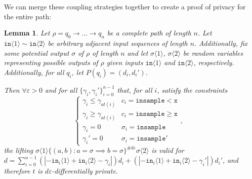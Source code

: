 \documentclass[12pt]{article}
\newcommand{\gguard}[1][x]{\texttt{insample}\geq #1}
\newcommand{\lguard}[1][x]{\texttt{insample} < #1}
\newcommand{\brangle}[1]{\langle #1 \rangle}
\newtheorem{lemma}[thm]{Lemma}
\theoremstyle{definition}
\begin{document}
We can merge these coupling strategies together to create a proof of privacy for the entire path: 

\begin{lemma}\label{multTransitionsCouplingProof}
    Let $\rho = q_0\to \ldots \to q_n$ be a complete path of length $n$. Let $\texttt{in}\brangle{1}\sim \texttt{in}\brangle{2}$ be arbitrary adjacent input sequences of length $n$. Additionally, fix some potential output $\sigma$ of $\rho$ of length $n$ and let $\sigma\brangle{1}$, $\sigma\brangle{2}$ be random variables representing possible outputs of $\rho$ given inputs $\texttt{in}\brangle{1}$ and $\texttt{in}\brangle{2}$, respectively. Additionally, for all $q_i$, let $P(q_i) = (d_i, d_i')$.

    Then $\forall \varepsilon>0$ and for all $\{\gamma_i, \gamma_i'\}_{i=0}^{n-1}$ that, for all $i$, satisfy the constraints \[
        \begin{cases}
          \gamma_i\leq\gamma_{at(i)} & c_i = \lguard[\texttt{x}]\\
          \gamma_i\geq\gamma_{at(i)} & c_i = \gguard[\texttt{x}]\\
          \gamma_i=0 & \sigma_i = \texttt{insample}\\
          \gamma_i'=0 & \sigma_i = \texttt{insample}'
        \end{cases},
      \]
      the lifting $\sigma\brangle{1}\{(a, b): a=\sigma\implies b=\sigma\}^{\#d\varepsilon}\sigma\brangle{2}$ is valid for $d = \sum_{i=0}^{n-1}(|-\texttt{in}_i\brangle{1}+\texttt{in}_i\brangle{2}-\gamma_i|)d_i+(|-\texttt{in}_i\brangle{1}+\texttt{in}_i\brangle{2}-\gamma_i'|)d_i'$, and therefore $t$ is $d\varepsilon$-differentially private. 
\end{lemma}
\end{document}
